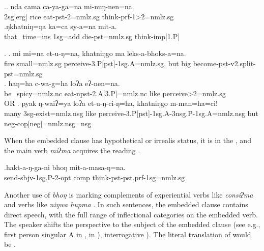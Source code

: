 \ex.\ag. nda cama ca-ya-ga=na mi-nuŋ-nen=na.\\
{\sc 2sg[erg]} rice eat-{\sc pst-2=nmlz.sg} think-{\sc prf-1>2=nmlz.sg}\\
\bg.ŋkhatniŋ=ŋa ka=ca sy-a=na mit-a.\\
that\_time{\sc =ins} {\sc 1sg=add} die{\sc [3sg]-pst=nmlz.sg} think{\sc -imp[1.P]}\\
 
	

\ex. \ag. mi mi=na et-u-ŋ=na, khatniŋgo ma leks-a-bhoks-a=na.\\
	fire small{\sc =nmlz.sg} perceive{\sc -3.P[pst]-1sg.A=nmlz.sg}, but big become{\sc [3sg]-pst-v2.split-pst=nmlz.sg}\\
	\bg. haŋ=ha c-wa-g=ha loʔa eʔ-nen=na.\\
be\_spicy{\sc =nmlz.nc} eat-{\sc npst-2.A[3.P]=nmlz.nc} like perceive{>2=nmlz.sg}\\
 OR
\bg. pyak ŋ-waiʔ=ya loʔa et-u-ŋ-ci-ŋ=ha, khatniŋgo m-man=ha=ciǃ\\
many {\sc 3sg-}exist{\sc =nmlz.nsg} like perceive{\sc -3.P[pst]-1sg.A-3nsg.P-1sg.A=nmlz.nsg} but {\sc neg-cop[neg]=nmlz.nsg=nsg}\\


When the embedded clause has hypothetical or irrealis status, it is in the ,  and the main verb \emph{miʔma}  acquires the reading .

\exg.hakt-a-ŋ-ga-ni bhoŋ mit-a-masa-ŋ=na.\\
send{\sc -sbjv-1sg.P-2-opt} {\sc comp} think{\sc -pst-pst.prf-1sg=nmlz.sg}\\


Another use of \emph{bhoŋ} is marking complements of experiential verbs like \emph{consiʔma}  and verbs like \emph{niŋwa hupma} . In such sentences, the embedded clause contains direct speech, with the full range of inflectional categories  on the embedded verb. The speaker shifts the perspective to the subject of the embedded clause (see e.g., first person singular A in \Next[a],   in \Next[b]), interrogative  \Next[c]).  The literal translation of \Next[a] would be . 
 
